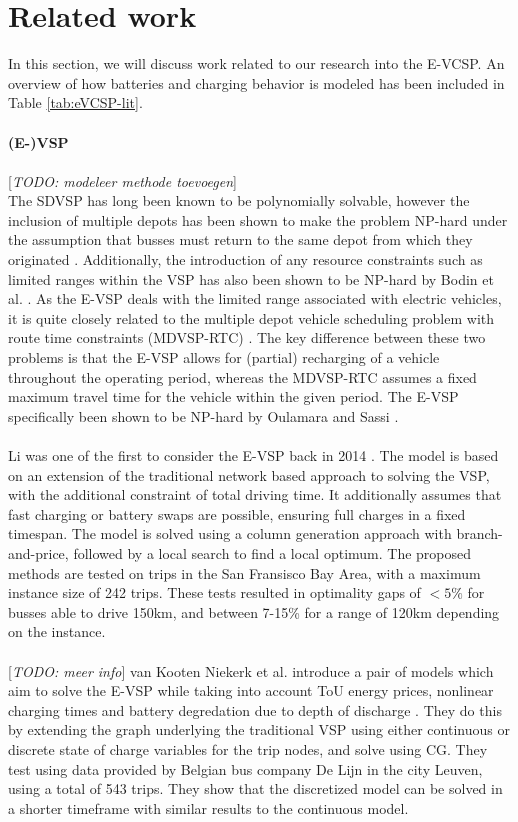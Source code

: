 \documentclass[]{article}
\newcommand{\todo}[1]{{\color{red}[\textit{TODO: #1}]}}
\begin{document}
\section{Related work}
In this section, we will discuss work related to our research into the E-VCSP.
An overview of how batteries and charging behavior is modeled has been included in Table \ref{tab:eVCSP-lit}. \\\\
\noindent \textbf{(E-)VSP} \\\\ \todo{modeleer methode toevoegen}\\ The SDVSP
has long been known to be polynomially solvable, however the inclusion of
multiple depots has been shown to make the problem NP-hard under the assumption
that busses must return to the same depot from which they originated
\cite{Bunte2009}. Additionally, the introduction of any resource constraints
such as limited ranges within the VSP has also been shown to be NP-hard by
Bodin et al. \cite{Bodin1983}. As the E-VSP deals with the limited range
associated with electric vehicles, it is quite closely related to the multiple
depot vehicle scheduling problem with route time constraints (MDVSP-RTC)
\cite{Haghani2002}. The key difference between these two problems is that the
E-VSP allows for (partial) recharging of a vehicle throughout the operating
period, whereas the MDVSP-RTC assumes a fixed maximum travel time for the
vehicle within the given period. The E-VSP specifically been shown to be
NP-hard by Oulamara and Sassi \cite{Sassi2014}. \\\\

Li was one of the first to consider the E-VSP back in 2014 \cite{Li2014}. The
model is based on an extension of the traditional network based approach to
solving the VSP, with the additional constraint of total driving time. It
additionally assumes that fast charging or battery swaps are possible, ensuring
full charges in a fixed timespan. The model is solved using a column generation
approach with branch-and-price, followed by a local search to find a local
optimum. The proposed methods are tested on trips in the San Fransisco Bay
Area, with a maximum instance size of 242 trips. These tests resulted in
optimality gaps of $<5\%$ for busses able to drive 150km, and between 7-15\%
for a range of 120km depending on the instance. \\\\

\todo{meer info} van
Kooten Niekerk et al. introduce a pair of models which aim to solve the E-VSP
while taking into account ToU energy prices, nonlinear charging times and
battery degredation due to depth of discharge \cite{vanKootenNiekerk2017}. They
do this by extending the graph underlying the traditional VSP using either
continuous or discrete state of charge variables for the trip nodes,
and solve using CG. They test using data provided
by Belgian bus company De Lijn in the city Leuven, using a total of 543 trips. They show that the
discretized model can be solved in a shorter timeframe with similar results to
the continuous model. \\\\
\end{document}
